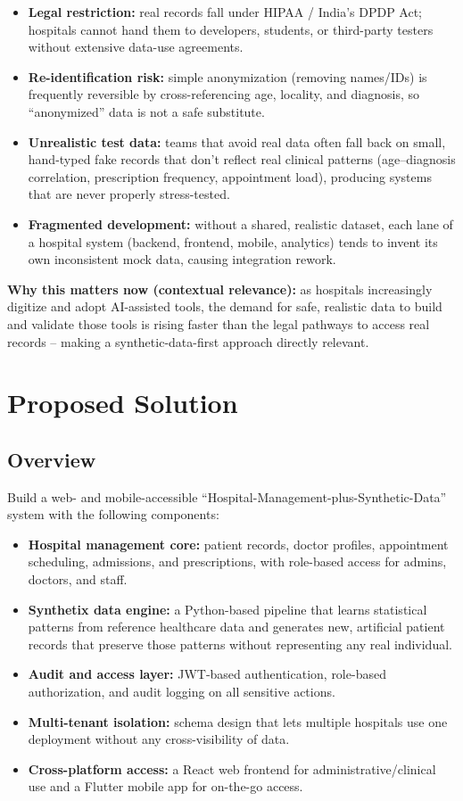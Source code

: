 \documentclass[11pt]{article}
\begin{document}
\begin{itemize}
    \item \textbf{Legal restriction:} real records fall under HIPAA / India's DPDP Act; hospitals cannot hand them to developers, students, or third-party testers without extensive data-use agreements.
    \item \textbf{Re-identification risk:} simple anonymization (removing names/IDs) is frequently reversible by cross-referencing age, locality, and diagnosis, so ``anonymized'' data is not a safe substitute.
    \item \textbf{Unrealistic test data:} teams that avoid real data often fall back on small, hand-typed fake records that don't reflect real clinical patterns (age--diagnosis correlation, prescription frequency, appointment load), producing systems that are never properly stress-tested.
    \item \textbf{Fragmented development:} without a shared, realistic dataset, each lane of a hospital system (backend, frontend, mobile, analytics) tends to invent its own inconsistent mock data, causing integration rework.
\end{itemize}

\textbf{Why this matters now (contextual relevance):} as hospitals increasingly digitize and adopt AI-assisted tools, the demand for safe, realistic data to build and validate those tools is rising faster than the legal pathways to access real records -- making a synthetic-data-first approach directly relevant.

\section{Proposed Solution}

\subsection{Overview}
Build a web- and mobile-accessible ``Hospital-Management-plus-Synthetic-Data'' system with the following components:
\begin{itemize}
    \item \textbf{Hospital management core:} patient records, doctor profiles, appointment scheduling, admissions, and prescriptions, with role-based access for admins, doctors, and staff.
    \item \textbf{Synthetix data engine:} a Python-based pipeline that learns statistical patterns from reference healthcare data and generates new, artificial patient records that preserve those patterns without representing any real individual.
    \item \textbf{Audit and access layer:} JWT-based authentication, role-based authorization, and audit logging on all sensitive actions.
    \item \textbf{Multi-tenant isolation:} schema design that lets multiple hospitals use one deployment without any cross-visibility of data.
    \item \textbf{Cross-platform access:} a React web frontend for administrative/clinical use and a Flutter mobile app for on-the-go access.
\end{itemize}
\end{document}
